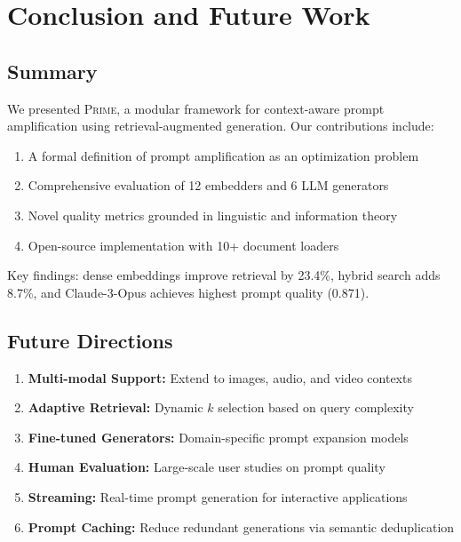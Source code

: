 \documentclass[11pt,a4paper]{article}
\newcommand{\primesys}{\textsc{Prime}}
\begin{document}
\section{Conclusion and Future Work}
\label{sec:conclusion}

\subsection{Summary}

We presented \primesys{}, a modular framework for context-aware prompt amplification using retrieval-augmented generation. Our contributions include:

\begin{enumerate}
    \item A formal definition of prompt amplification as an optimization problem
    \item Comprehensive evaluation of 12 embedders and 6 LLM generators
    \item Novel quality metrics grounded in linguistic and information theory
    \item Open-source implementation with 10+ document loaders
\end{enumerate}

Key findings: dense embeddings improve retrieval by 23.4\%, hybrid search adds 8.7\%, and Claude-3-Opus achieves highest prompt quality (0.871).

\subsection{Future Directions}

\begin{enumerate}
    \item \textbf{Multi-modal Support:} Extend to images, audio, and video contexts
    \item \textbf{Adaptive Retrieval:} Dynamic $k$ selection based on query complexity
    \item \textbf{Fine-tuned Generators:} Domain-specific prompt expansion models
    \item \textbf{Human Evaluation:} Large-scale user studies on prompt quality
    \item \textbf{Streaming:} Real-time prompt generation for interactive applications
    \item \textbf{Prompt Caching:} Reduce redundant generations via semantic deduplication
\end{enumerate}
\end{document}
